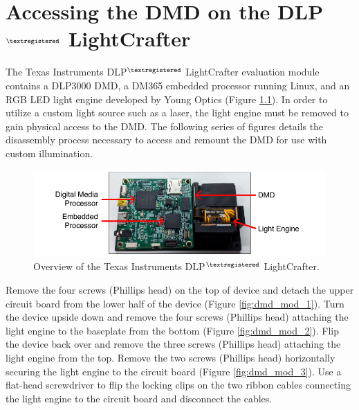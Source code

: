 
\chapter{Accessing the DMD on the DLP$^{\tiny{\textregistered}}$ LightCrafter}

The Texas Instruments DLP$^{\tiny{\textregistered}}$ LightCrafter evaluation module contains a DLP3000 DMD, a DM365 embedded processor running Linux, and an RGB LED light engine developed by Young Optics (Figure \ref{fig:dmd_mod_0}). In order to utilize a custom light source such as a laser, the light engine must be removed to gain physical access to the DMD. The following series of figures details the disassembly process necessary to access and remount the DMD for use with custom illumination.

\begin{figure}
    \includegraphics{figures/appendix_b/dmd_mod_0.pdf}
    \caption {
        \label{fig:dmd_mod_0}
        Overview of the Texas Instruments DLP$^{\tiny{\textregistered}}$ LightCrafter.
    }
\end{figure}

Remove the four screws (Phillips head) on the top of device and detach the upper circuit board from the lower half of the device (Figure \ref{fig:dmd_mod_1}). Turn the device upside down and remove the four screws (Phillips head) attaching the light engine to the baseplate from the bottom (Figure \ref{fig:dmd_mod_2}). Flip the device back over and remove the three screws (Phillips head) attaching the light engine from the top. Remove the two screws (Phillips head) horizontally securing the light engine to the circuit board (Figure \ref{fig:dmd_mod_3}). Use a flat-head screwdriver to flip the locking clips on the two ribbon cables connecting the light engine to the circuit board and disconnect the cables.

